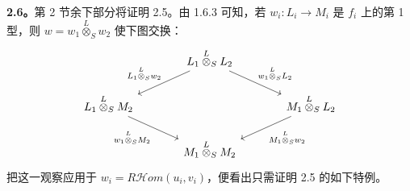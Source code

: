 \textbf{2.6。}第 2 节余下部分将证明 2.5。由 1.6.3 可知，若 $w_i:L_i\to M_i$ 是 $f_i$ 上的第 1 型，则 $w=w_1\mathbin{\overset L\otimes}_S w_2$ 使下图交换：
\[
\begin{tikzcd}[column sep=large]
& L_1\mathbin{\overset L\otimes}_S L_2\arrow[dl,"L_1\mathbin{\overset L\otimes}_S w_2"']\arrow[dr,"w_1\mathbin{\overset L\otimes}_S L_2"] &\\
L_1\mathbin{\overset L\otimes}_S M_2\arrow[dr,"w_1\mathbin{\overset L\otimes}_S M_2"'] && M_1\mathbin{\overset L\otimes}_S L_2\arrow[dl,"M_1\mathbin{\overset L\otimes}_S w_2"]\\
& M_1\mathbin{\overset L\otimes}_S M_2 &
\end{tikzcd}
\]
把这一观察应用于 $w_i=R\mathcal Hom(u_i,v_i)$，便看出只需证明 2.5 的如下特例。

